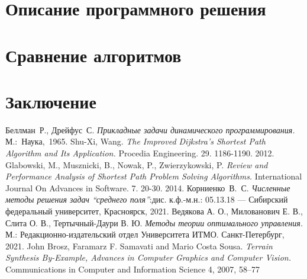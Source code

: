    \section{Описание программного решения}
    
    \section{Сравнение алгоритмов}
    
    \section{Заключение}
    
    \newpage
    \begin{thebibliography}{9}
         Беллман~Р., Дрейфус~С. \textit{Прикладные задачи динамического программирования.} М.:~Наука,~1965.
         Shu-Xi, Wang. \textit{The Improved Dijkstra's Shortest Path Algorithm and Its Application.} Procedia Engineering. 29. 1186-1190. 2012.
         Glabowski, M., Musznicki, B., Nowak, P., Zwierzykowski, P. \textit{Review and Performance Analysis of Shortest Path Problem Solving Algorithms.} International Journal On Advances in Software. 7. 20-30. 2014.
         Корниенко~В.~С. \textit{Численные методы решения задач ``среднего поля''}:дис. к.ф.-м.н.: 05.13.18 --- Сибирский федеральный университет, Красноярск, 2021.
         Ведякова А. О., Милованович Е. В., Слита О. В., Тертычный-Даури В. Ю. \textit{Методы теории оптимального управления.} М.: Редакционно-издательский отдел Университета ИТМО. Санкт-Петербург, 2021.
         John Brosz, Faramarz F. Samavati and Mario Costa Sousa. \textit{Terrain Synthesis By-Example, Advances in Computer Graphics and Computer Vision.} Communications in Computer and Information Science 4, 2007, 58--77
    \end{thebibliography}



